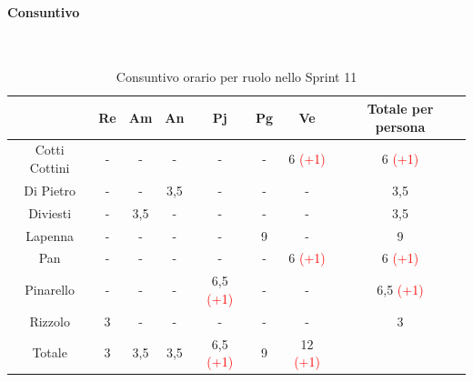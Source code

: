 \documentclass{article}
\begin{document}
                \paragraph{Consuntivo}\mbox{}\\
                \begin{table}[H]
                    \centering
                    \begin{tabular}{|c|c|c|c|c|c|c|c|}
                    \hline
                                  & Re  & Am  & An  & Pj  & Pg  & Ve  & Totale per persona \\ \hline
                    Cotti Cottini & -   & -   & -   & -   & -   & 6 \textcolor{red}{(+1)}   & 6 \textcolor{red}{(+1)}                  \\ \hline
                    Di Pietro     & -   & -   & 3,5 & -   & -   & -   & 3,5                \\ \hline
                    Diviesti      & -   & 3,5 & -   & -   & -   & -   & 3,5                \\ \hline
                    Lapenna       & -   & -   & -   & -   & 9  & -   & 9                 \\ \hline
                    Pan           & -   & -   & -   & -   & -   & 6 \textcolor{red}{(+1)}   & 6 \textcolor{red}{(+1)}                  \\ \hline
                    Pinarello     & -   & -   & -   & 6,5 \textcolor{red}{(+1)} & -   & -   & 6,5 \textcolor{red}{(+1)}               \\ \hline
                    Rizzolo       & 3   & -   & -   & -   & -   & -   & 3                  \\ \hline
                    Totale        & 3   & 3,5 & 3,5 & 6,5 \textcolor{red}{(+1)} & 9  & 12 \textcolor{red}{(+1)}  &                    \\ \hline
                    \end{tabular}
                    \caption{Consuntivo orario per ruolo nello Sprint 11}
                \end{table}

\end{document}
